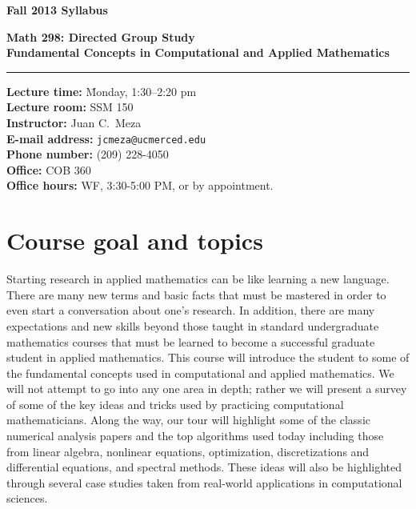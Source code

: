 \documentclass{article}
\begin{document}
\centerline{{\bf \Large Fall 2013 Syllabus}}
\vspace{.2in}
{\bf \large Math 298: Directed Group Study} \\
{\bf \large Fundamental Concepts in Computational and Applied Mathematics} \\
\rule{6.5in}{.02in}


\begin{tabbing}
{\bf Lecture time:} \quad \quad \= Monday, 1:30--2:20 pm \\
{\bf Lecture room:} \> SSM 150 \\
{\bf Instructor:} \> Juan C.~Meza \\
{\bf E-mail address:} \> {\tt jcmeza@ucmerced.edu} \\
{\bf Phone number:} \> (209) 228-4050 \\
{\bf Office:} \> COB 360 \\
{\bf Office hours:} \> WF, 3:30-5:00 PM, or by appointment. \\
\end{tabbing}

\section*{Course goal and topics} Starting research in applied mathematics can be like learning a new language.  There are many new terms and basic facts that must be mastered in order to even start a conversation about one's research.  In addition, there are many expectations and new skills beyond those taught in standard undergraduate mathematics courses that must be learned to become a successful graduate student in applied mathematics.  This course will introduce the student to some of the fundamental concepts used in computational and applied mathematics.  We will not attempt to go into any one area in depth; rather we will present a survey of some of the key ideas and tricks used by practicing computational mathematicians.  Along the way, our tour will highlight some of the classic numerical analysis papers and the top algorithms used today including those from linear algebra, nonlinear equations, optimization, discretizations and differential equations, and spectral methods.  These ideas will also be highlighted through several case studies taken from real-world applications in computational sciences.
\end{document}
